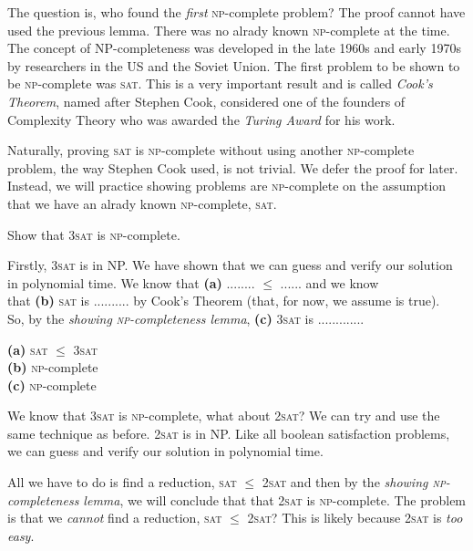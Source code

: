 The question is, who found the \textit{first} \textsc{np}-complete problem?
The proof cannot have used the previous lemma. There was no alrady known 
\textsc{np}-complete at the time.
The concept of NP-completeness was developed in the late 1960s 
and early 1970s by researchers in the US and the Soviet Union.
The first problem to be shown to be \textsc{np}-complete was \textsc{sat}.
This is a very important result and is called \textit{Cook's Theorem}, named 
after Stephen Cook, considered one of the founders of Complexity Theory 
who was awarded the \textit{Turing Award} for his work. 


Naturally, proving \textsc{sat} is \textsc{np}-complete without using 
another \textsc{np}-complete problem, the way Stephen Cook used, is 
not trivial. We defer the proof for later. Instead, we will practice 
showing problems are \textsc{np}-complete on the assumption that 
we have an alrady known \textsc{np}-complete, \textsc{sat}. 

\frmrule

\begin{example}
Show that \textsc{3sat} is \textsc{np}-complete.

Firstly, \textsc{3sat} is in NP. We have shown that we 
can guess and verify our solution in polynomial time. 
We know that \textbf{(a)} ........ $\leqslant$ ...... and we know \\
that \textbf{(b)}  \textsc{sat} is .......... by Cook's Theorem 
(that, for now, we assume is true). \\
So, by the \textit{showing \textsc{np}-completeness lemma}, 
\textbf{(c)} \textsc{3sat} is  .............

\end{example}

{
\textbf{(a)} \textsc{sat} $\leqslant$ \textsc{3sat} \\
\textbf{(b)} \textsc{np}-complete \\
\textbf{(c)} \textsc{np}-complete 
}

\frmrule

We know that \textsc{3sat} is \textsc{np}-complete, 
what about \textsc{2sat}? We can try and use the same technique as 
before. \textsc{2sat} is in NP. Like all boolean satisfaction problems, 
we can guess and verify our solution in polynomial time. 

All we have to do is find a reduction, \textsc{sat} $\leqslant$ \textsc{2sat}
and then by the \textit{showing \textsc{np}-completeness lemma},  
we will conclude that that \textsc{2sat}  is \textsc{np}-complete. 
The problem is that we \textit{cannot} find a reduction, 
\textsc{sat} $\leqslant$ \textsc{2sat}?
This is likely because \textsc{2sat} is \textit{too easy}. 

